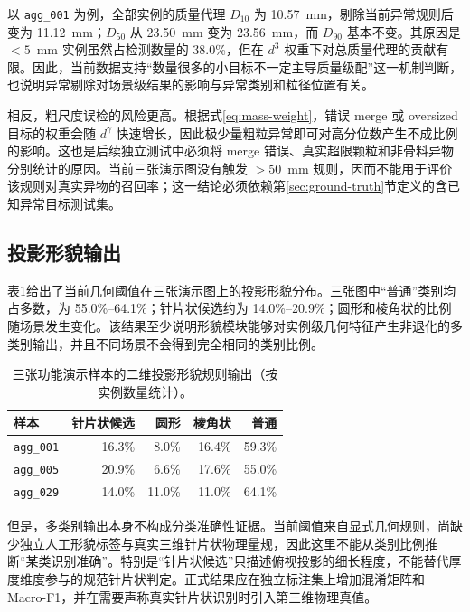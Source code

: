 以 \texttt{agg\_001} 为例，全部实例的质量代理 $D_{10}$ 为 10.57~mm，剔除当前异常规则后变为 11.12~mm；$D_{50}$ 从 23.50~mm 变为 23.56~mm，而 $D_{90}$ 基本不变。其原因是 $<5$~mm 实例虽然占检测数量的 38.0\%，但在 $d^3$ 权重下对总质量代理的贡献有限。因此，当前数据支持“数量很多的小目标不一定主导质量级配”这一机制判断，也说明异常剔除对场景级结果的影响与异常类别和粒径位置有关。

相反，粗尺度误检的风险更高。根据式\eqref{eq:mass-weight}，错误 merge 或 oversized 目标的权重会随 $d^\gamma$ 快速增长，因此极少量粗粒异常即可对高分位数产生不成比例的影响。这也是后续独立测试中必须将 merge 错误、真实超限颗粒和非骨料异物分别统计的原因。当前三张演示图没有触发 $>50$~mm 规则，因而不能用于评价该规则对真实异物的召回率；这一结论必须依赖第\ref{sec:ground-truth}节定义的含已知异常目标测试集。

\subsection{投影形貌输出}
\label{sec:shape-demo-results}

表\ref{tab:demo-shape-results}给出了当前几何阈值在三张演示图上的投影形貌分布。三张图中“普通”类别均占多数，为 55.0\%--64.1\%；针片状候选约为 14.0\%--20.9\%；圆形和棱角状的比例随场景发生变化。该结果至少说明形貌模块能够对实例级几何特征产生非退化的多类别输出，并且不同场景不会得到完全相同的类别比例。

\begin{table}[htbp]
\centering
\caption{三张功能演示样本的二维投影形貌规则输出（按实例数量统计）。}
\label{tab:demo-shape-results}
\small
\begin{tabular}{lrrrr}
\toprule
样本 & 针片状候选 & 圆形 & 棱角状 & 普通 \\
\midrule
\texttt{agg\_001} & 16.3\% & 8.0\%  & 16.4\% & 59.3\% \\
\texttt{agg\_005} & 20.9\% & 6.6\%  & 17.6\% & 55.0\% \\
\texttt{agg\_029} & 14.0\% & 11.0\% & 11.0\% & 64.1\% \\
\bottomrule
\end{tabular}
\end{table}

但是，多类别输出本身不构成分类准确性证据。当前阈值来自显式几何规则，尚缺少独立人工形貌标签与真实三维针片状物理量规，因此这里不能从类别比例推断“某类识别准确”。特别是“针片状候选”只描述俯视投影的细长程度，不能替代厚度维度参与的规范针片状判定。正式结果应在独立标注集上增加混淆矩阵和 Macro-F1，并在需要声称真实针片状识别时引入第三维物理真值。

